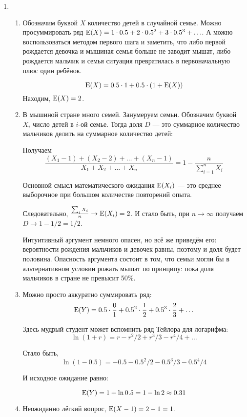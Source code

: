 \begin{enumerate}
\item
\begin{enumerate}
  \item Обозначим буквой $X$ количество детей в случайной семье.
  Можно просуммировать ряд $\operatorname{E}(X) = 1\cdot 0.5 + 2\cdot 0.5^2 + 3\cdot 0.5^3 + \ldots$. 
  А можно воспользоваться методом первого шага и заметить, что либо первой рождается девочка 
  и мышиная семья больше не заводит мышат, либо рождается мальчик и семья ситуация превратилась в первоначальную
  плюс один ребёнок.

  \[
  \operatorname{E}(X) = 0.5 \cdot 1 + 0.5 \cdot (1 + \operatorname{E}(X))  
  \]
  Находим, $\operatorname{E}(X)=2$.
  \item В мышиной стране много семей. Занумеруем семьи. Обозначим буквой $X_i$ число детей в $i$-ой семье.
  Тогда доля $D$ — это суммарное количество мальчиков делить на суммарное количество детей:

  Получаем
  \[
  \frac{(X_1 - 1) + (X_2 - 2)+ \ldots + (X_n - 1)}{X_1 + X_2 + \ldots +X_n} = 1 - \frac{n}{\sum_{i=1}^n X_i}  
  \]

  Основной смысл математического ожидания $\operatorname{E}(X_i)$ — это среднее выборочное при большом количестве повторений опыта.

  Следовательно, $\frac{\sum_i X_i}{n} \to \operatorname{E}(X_i)=2$. И стало быть, при $n\to\infty$ получаем $D \to 1 - 1/2=1/2$.

  Интуитивный аргумент немного опасен, но всё же приведём его: вероятности рождения мальчиков и девочек равны,
  поэтому и доля будет половина. 
  Опасность аргумента состоит в том, что семьи могли бы в альтернативном условии рожать мышат по принципу: 
  пока доля мальчиков в стране не превысит 50\%. 

  \item Можно просто аккуратно суммировать ряд:
  \[
  \operatorname{E}(Y) = 0.5 \cdot \frac{0}{1} + 0.5^2 \cdot \frac{1}{2} + 0.5^3 \cdot \frac{2}{3} + \ldots
  \]
  
  Здесь мудрый студент может вспомнить ряд Тейлора для логарифма:
  \[
  \ln (1 + r) = r - r^2/2 + r^3/3 - r^4/4 +\ldots
  \]

  Стало быть,
  \[
  \ln (1 - 0.5) = -0.5 - 0.5^2/2 - 0.5^3/3 - 0.5^4/4  
  \]

  И исходное ожидание равно:

  \[
  \operatorname{E}(Y) = 1 + \ln 0.5 = 1 - \ln 2 \approx 0.31  
  \]

\item Неожиданно лёгкий вопрос, $\operatorname{E}(X - 1) = 2 -1=1$.
\end{enumerate}



\end{enumerate}
